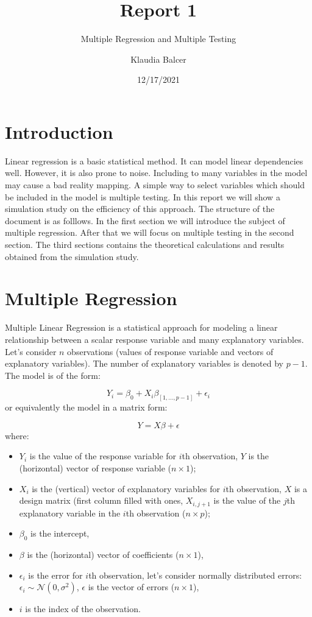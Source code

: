 \documentclass[
]{article}
\title{Report 1}
\subtitle{Multiple Regression and Multiple Testing}
\author{Klaudia Balcer}
\date{12/17/2021}
\begin{document}
\maketitle

{
\setcounter{tocdepth}{3}
\tableofcontents
}
\pagebreak

\hypertarget{introduction}{%
\section{Introduction}\label{introduction}}

Linear regression is a basic statistical method. It can model linear
dependencies well. However, it is also prone to noise. Including to many
variables in the model may cause a bad reality mapping. A simple way to
select variables which should be included in the model is multiple
testing. In this report we will show a simulation study on the
efficiency of this approach. The structure of the document is as
folllows. In the first section we will introduce the subject of multiple
regression. After that we will focus on multiple testing in the second
section. The third sections contains the theoretical calculations and
results obtained from the simulation study.

\hypertarget{multiple-regression}{%
\section{Multiple Regression}\label{multiple-regression}}

Multiple Linear Regression is a statistical approach for modeling a
linear relationship between a scalar response variable and many
explanatory variables. Let's consider \(n\) observations (values of
response variable and vectors of explanatory variables). The number of
explanatory variables is denoted by \(p-1\). The model is of the form:

\[Y_i = \beta_0 + X_i\beta_{[1, \ldots,p-1]} + \epsilon_i\] or
equivalently the model in a matrix form:

\[Y = X\beta + \epsilon\] where:

\begin{itemize}
\item
  \(Y_i\) is the value of the response variable for \(i\)th observation,
  \(Y\) is the (horizontal) vector of response variable
  (\(n \times 1\));
\item
  \(X_i\) is the (vertical) vector of explanatory variables for \(i\)th
  observation, \(X\) is a design matrix (first column filled with ones,
  \(X_{i, j+1}\) is the value of the \(j\)th explanatory variable in the
  \(i\)th observation (\(n \times p\));
\item
  \(\beta_0\) is the intercept,
\item
  \(\beta\) is the (horizontal) vector of coefficients (\(n \times 1\)),
\item
  \(\epsilon_i\) is the error for \(i\)th observation, let's consider
  normally distributed errors:
  \(\epsilon_i \sim \mathcal N (0, \sigma^2)\), \(\epsilon\) is the
  vector of errors (\(n \times 1\)),
\item
  \(i\) is the index of the observation.
\end{itemize}
\end{document}
